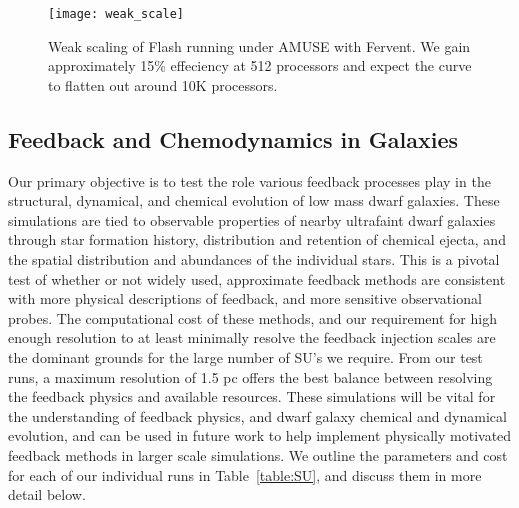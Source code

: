 \documentclass[11pt]{article}
\begin{document}
\begin{figure}
\centering
\texttt{[image: weak\_scale]}
\caption{Weak scaling of Flash running under AMUSE with Fervent. We gain approximately 15\% effeciency at 512 processors and expect the curve to flatten out around 10K processors.}
\label{fig:weakscale}
\end{figure}


\subsection{Feedback and Chemodynamics in Galaxies}

Our primary objective is to test the role various feedback processes play in the structural, dynamical, and chemical evolution of low mass dwarf galaxies. These simulations are tied to observable properties of nearby ultrafaint dwarf galaxies through star formation history, distribution and retention of chemical ejecta, and the spatial distribution and abundances of the individual stars. This is a pivotal test of whether or not widely used, approximate feedback methods are consistent with more physical descriptions of feedback, and more sensitive observational probes. The computational cost of these methods, and our requirement for high enough resolution to at least minimally resolve the feedback injection scales are the dominant grounds for the large number of SU's we require. From our test runs, a maximum resolution of 1.5 pc offers the best balance between resolving the feedback physics and available resources. These simulations will be vital for the understanding of feedback physics, and dwarf galaxy chemical and dynamical evolution, and can be used in future work to help implement physically motivated feedback methods in larger scale simulations. We outline the parameters and cost for each of our individual runs in Table~\ref{table:SU}, and discuss them in more detail below.
\end{document}
